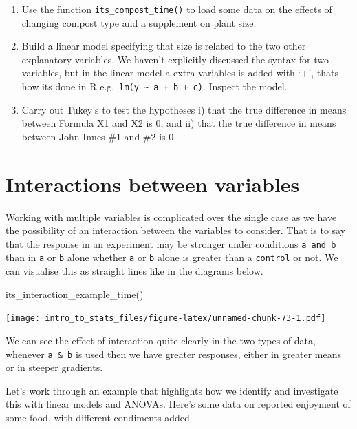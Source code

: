 \documentclass[
]{book}
\newenvironment{Shaded}{\begin{snugshade}}{\end{snugshade}}
\newcommand{\FunctionTok}[1]{\textcolor[rgb]{0.00,0.00,0.00}{#1}}
\newcommand{\NormalTok}[1]{#1}
\providecommand{\tightlist}{%
  \setlength{\itemsep}{0pt}\setlength{\parskip}{0pt}}
\newenvironment{task}
{ \begin{tcolorbox}[title=For you to do,title filled] }
{  \end{tcolorbox} }
\begin{document}
\begin{task}
\begin{enumerate}
\def\labelenumi{\arabic{enumi}.}
\tightlist
\item
  Use the function \texttt{its\_compost\_time()} to load some data on the effects of changing compost type and a supplement on plant size.
\item
  Build a linear model specifying that size is related to the two other explanatory variables. We haven't explicitly discussed the syntax for two variables, but in the linear model a extra variables is added with `+', thats how its done in R e.g.~\texttt{lm(y\ \textasciitilde{}\ a\ +\ b\ +\ c)}. Inspect the model.
\item
  Carry out Tukey's to test the hypotheses i) that the true difference in means between Formula X1 and X2 is 0, and ii) that the true difference in means between John Innes \#1 and \#2 is 0.
\end{enumerate}
\end{task}

\hypertarget{interactions-between-variables}{%
\section{Interactions between variables}\label{interactions-between-variables}}

Working with multiple variables is complicated over the single case as we have the possibility of an interaction between the variables to consider. That is to say that the response in an experiment may be stronger under conditions \texttt{a\ and\ b} than in \texttt{a} or \texttt{b} alone whether \texttt{a} or \texttt{b} alone is greater than a \texttt{control} or not. We can visualise this as straight lines like in the diagrams below.

\begin{Shaded}
\begin{Highlighting}[]
\FunctionTok{its\_interaction\_example\_time}\NormalTok{()}
\end{Highlighting}
\end{Shaded}

\texttt{[image: intro\_to\_stats\_files/figure-latex/unnamed-chunk-73-1.pdf]}

We can see the effect of interaction quite clearly in the two types of data, whenever \texttt{a\ \&\ b} is used then we have greater responses, either in greater means or in steeper gradients.

Let's work through an example that highlights how we identify and investigate this with linear models and ANOVAs. Here's some data on reported enjoyment of some food, with different condiments added
\end{document}
